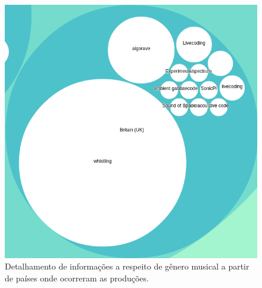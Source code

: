\begin{figure}
\begin{center}
\includegraphics[scale=0.6]{./imagens/zoomable_circle_packing_genre_year_livecoding4.png}
\caption{Detalhamento de informações a respeito de gênero musical a partir de países onde ocorreram as produções.}
\label{pacotao4}
\end{center}
\end{figure}



